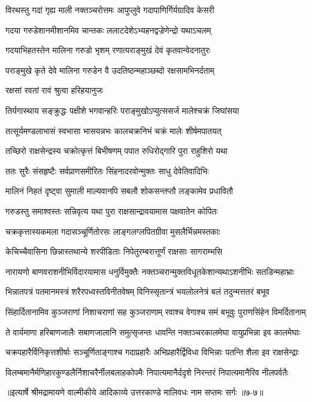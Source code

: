 \twolineshloka
{विरथस्तु गदां गृह्य माली नक्तञ्चरोत्तमः}
{आपुप्लुवे गदापाणिर्गिर्यग्रादिव केसरी} %

\twolineshloka
{गदया गरुडेशानमीशानमिव चान्तकः}
{ललाटदेशेऽभ्यहनद्वज्रेणेन्द्रो यथाऽचलम्} %

\twolineshloka
{गदयाभिहतस्तेन मालिना गरुडो भृशम्}
{रणात्पराङ्मुखं देवं कृतवान्वेदनातुरः} %

\twolineshloka
{पराङ्मुखे कृते देवे मालिना गरुडेन वै}
{उदतिष्ठन्महाञ्छब्दो रक्षसामभिनर्दताम्} %

\onelineshloka
{रक्षसां रवतां रावं श्रुत्वा हरिहयानुजः} %

\twolineshloka
{तिर्यगास्थाय सङ्क्रुद्धः पक्षीशे भगवान्हरिः}
{पराङ्मुखोऽप्युत्ससर्ज मालेश्चक्रं जिघांसया} %

\twolineshloka
{तत्सूर्यमण्डलाभासं स्वभासा भासयन्नभः}
{कालचक्रनिभं चक्रं मालेः शीर्षमपातयत्} %

\twolineshloka
{तच्छिरो राक्षसेन्द्रस्य चक्रोत्कृत्तं बिभीषणम्}
{पपात रुधिरोद्गारि पुरा राहुशिरो यथा} %

\twolineshloka
{ततः सुरैः संसहृष्टैः सर्वप्राणसमीरितः}
{सिंहनादरवोन्मुक्तः साधु देवेतिवादिभिः} %

\twolineshloka
{मालिनं निहतं दृष्ट्वा सुमाली माल्यवानपि}
{सबलौ शोकसन्तप्तौ लङ्कामेव प्रधावितौ} %

\twolineshloka
{गरुडस्तु समाश्वस्तः सन्निवृत्य यथा पुरा}
{राक्षसान्द्रावयामास पक्षवातेन कोपितः} %

\twolineshloka
{चक्रकृत्तास्यकमला गदासञ्चूर्णितोरसः}
{लाङ्गलग्लपितग्रीवा मुसलैर्भिन्नमस्तकाः} %

\twolineshloka
{केचिच्चैवासिना छिन्नास्तथान्ये शरपीडिताः}
{निपेतुरम्बरात्तूर्णं राक्षसाः सागराम्भसि} %

\twolineshloka
{नारायणो बाणवराशनीभिर्विदारयामास धनुर्विमुक्तैः}
{नक्तञ्चरान्मुक्तविधूतकेशान्यथाऽशनीभिः सतडिन्महाभ्राः} %

\twolineshloka
{भिन्नातपत्रं पतमानमस्त्रं शरैरपध्वस्तविनीतवेषम्}
{विनिस्सृतान्त्रं भयलोलनेत्रं बलं तदुन्मत्ततरं बभूव} %

\twolineshloka
{सिंहार्दितानामिव कुञ्जराणां निशाचराणां सह कुञ्जराणाम्}
{रवाश्च वेगाश्च समं बभूवुः पुराणसिंहेन विमर्दितानाम्} %

\twolineshloka
{ते वार्यमाणा हरिबाणजालैः सबाणजालानि समुत्सृजन्तः}
{धावन्ति नक्तञ्चरकालमेघा वायुप्रभिन्ना इव कालमेघाः} %

\twolineshloka
{चक्रपहारैर्विनिकृत्तशीर्षाः सञ्चूर्णिताङ्गाश्च गदाप्रहारैः}
{अभिप्रहारैर्द्विविधा विभिन्नाः पतन्ति शैला इव राक्षसेन्द्राः} %

\twolineshloka
{विलम्बमानैर्मणिहारकुण्डलैर्निशाचरैर्नीलबलाहकोपमैः}
{निपात्यमानैर्ददृशे निरन्तरं निपात्यमानैरिव नीलपर्वतैः} %


॥इत्यार्षे श्रीमद्रामायणे वाल्मीकीये आदिकाव्ये उत्तरकाण्डे मालिवधः नाम सप्तमः सर्गः ॥७-७॥
